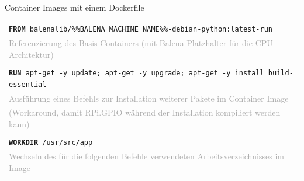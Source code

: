{
\scriptsize

\begin{frame}{Container Images mit einem Dockerfile}

    \bigskip

    {
    \tiny

    \begin{tabular}{|p{\textwidth}|}
        \hline

        \cellcolor{gray!15}
        \texttt{\textbf{FROM} balenalib/\%\%BALENA\_MACHINE\_NAME\%\%-debian-python:latest-run} \\
        \cellcolor{gray!15}
        \textcolor{darkgray}{Referenzierung des Basis-Containers (mit Balena-Platzhalter für die CPU-Architektur)} \\

        \cellcolor{gray!7}
        \\

        \cellcolor{gray!15}
        \texttt{\textbf{RUN} apt-get -y update; apt-get -y upgrade; apt-get -y install build-essential} \\
        \cellcolor{gray!15}
        \textcolor{darkgray}{Ausführung eines Befehls zur Installation weiterer Pakete im Container Image} \\
        \cellcolor{gray!15}
        \textcolor{darkgray}{(Workaround, damit RPi.GPIO während der Installation kompiliert werden kann)} \\

        \cellcolor{gray!7}
        \\

        \cellcolor{gray!15}
        \texttt{\textbf{WORKDIR} /usr/src/app} \\
        \cellcolor{gray!15}
        \textcolor{darkgray}{Wechseln des für die folgenden Befehle verwendeten Arbeitsverzeichnisses im Image} \\


\end{tabular}}
\end{frame}}
